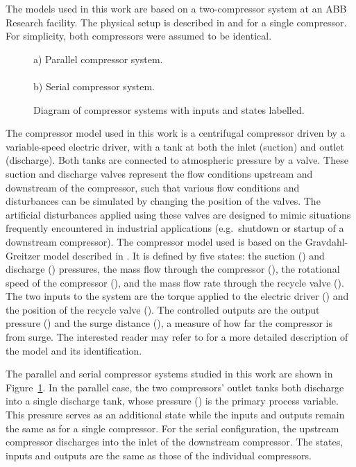 \label{sec:modelling}
The models used in this work are based on a two-compressor system at an ABB Research facility.
The physical setup is described in \cite{Cortinovis2014} and \cite{Cortinovis2015} for a single compressor.
For simplicity, both compressors were assumed to be identical.

\begin{figure}
    
    {\centering a) Parallel compressor system.\\}
    \\
    {\centering b) Serial compressor system.\\}
  \caption[Diagram of compressor systems.]{Diagram of compressor systems with inputs and states labelled.}
  \label{fig:comp-systems-diagrams}
\end{figure}


The compressor model used in this work is a centrifugal compressor driven by a variable-speed electric driver, with a tank at both the inlet (suction) and outlet (discharge).
Both tanks are connected to atmospheric pressure by a valve.
These suction and discharge valves represent the flow conditions upstream and downstream of the compressor, such that various flow conditions and disturbances can be simulated by changing the position of the valves.
The artificial disturbances applied using these valves are designed to mimic situations frequently encountered in industrial applications (e.g.\ shutdown or startup of a downstream compressor).
The compressor model used is based on the Gravdahl-Greitzer model described in \cite{Gravdahl1999}. 
It is defined by five states: the suction () and discharge () pressures, the mass flow through the compressor (), the rotational speed of the compressor (), and the mass flow rate through the recycle valve ().
The two inputs to the system are the torque applied to the electric driver () and the position of the recycle valve ().
The controlled outputs are the output pressure () and the surge distance (), a measure of how far the compressor is from surge.
The interested reader may refer to \cite{Cortinovis2015} for a more detailed description of the model and its identification.

The parallel and serial compressor systems studied in this work are shown in Figure~\ref{fig:comp-systems-diagrams}.
In the parallel case, the two compressors' outlet tanks both discharge into a single discharge tank, whose pressure () is the primary process variable.
This pressure serves as an additional state while the inputs and outputs remain the same as for a single compressor.
For the serial configuration, the upstream compressor discharges into the inlet of the downstream compressor.
The states, inputs and outputs are the same as those of the individual compressors.

